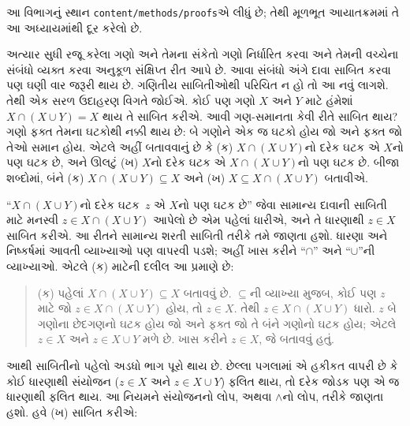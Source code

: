 \label{guunit:OLP-0721}


\begin{editorial}
આ વિભાગનું સ્થાન \verb|content/methods/proofs|એ લીધું છે;
તેથી મૂળભૂત આયાતક્રમમાં તે આ અધ્યાયમાંથી દૂર કરેલો છે.
\end{editorial}

\begin{explain}
અત્યાર સુધી રજૂ કરેલા ગણો અને તેમના સંકેતો ગણો નિર્ધારિત કરવા
અને તેમની વચ્ચેના સંબંધો વ્યક્ત કરવા અનુકૂળ સંક્ષિપ્ત રીત આપે છે.
આવા સંબંધો અંગે દાવા સાબિત કરવા પણ ઘણી વાર જરૂરી થાય છે.
ગણિતીય સાબિતીઓથી પરિચિત ન હો તો આ નવું લાગશે.
તેથી એક સરળ ઉદાહરણ વિગતે જોઈએ.
કોઈ પણ ગણો $X$ અને $Y$ માટે હંમેશાં
$X \cap (X \cup Y) = X$ થાય તે સાબિત કરીએ.
આવી ગણ-સમાનતા કેવી રીતે સાબિત થાય?
ગણો ફક્ત તેમના ઘટકોથી નક્કી થાય છે:
બે ગણોને એક જ ઘટકો હોય જો અને ફક્ત જો તેઓ સમાન હોય.
એટલે અહીં બતાવવાનું છે કે (ક) $X \cap (X \cup
Y)$નો દરેક ઘટક એ $X$નો પણ ઘટક છે,
અને ઊલટું (ખ) $X$નો દરેક ઘટક એ
$X \cap (X \cup Y)$નો પણ ઘટક છે.
બીજા શબ્દોમાં, બંને (ક) $X \cap (X \cup Y) \subseteq X$
અને (ખ) $X \subseteq X \cap (X \cup Y)$ બતાવીએ.

``$X \cap (X \cup Y)$નો દરેક ઘટક~$z$
એ $X$નો પણ ઘટક છે'' જેવા સામાન્ય દાવાની સાબિતી
માટે મનસ્વી $z \in X \cap (X \cup Y)$ આપેલો છે એમ
પહેલાં ધારીએ, અને તે ધારણાથી $z \in X$ સાબિત કરીએ.
આ રીતને સામાન્ય શરતી સાબિતી તરીકે તમે જાણતા હશો.
ધારણા અને નિષ્કર્ષમાં આવતી વ્યાખ્યાઓ પણ વાપરવી પડશે;
અહીં ખાસ કરીને ``$\cap$'' અને ``$\cup$''ની વ્યાખ્યાઓ.
એટલે (ક) માટેની દલીલ આ પ્રમાણે છે:

\begin{quote}
(ક) પહેલાં $X \cap (X \cup Y) \subseteq X$ બતાવવું છે.
$\subseteq$ની વ્યાખ્યા મુજબ, કોઈ પણ $z$ માટે
જો $z \in X \cap (X \cup Y)$ હોય, તો $z \in X$.
તેથી $z \in X \cap (X \cup Y)$ ધારો.
$z$ બે ગણોના છેદગણનો ઘટક હોય જો અને ફક્ત જો
તે બંને ગણોનો ઘટક હોય; એટલે $z \in X$ અને
$z \in X \cup Y$ મળે છે. ખાસ કરીને $z \in X$,
જે બતાવવું હતું.
\end{quote}

આથી સાબિતીનો પહેલો અડધો ભાગ પૂરો થાય છે.
છેલ્લા પગલામાં એ હકીકત વાપરી છે કે કોઈ ધારણાથી
સંયોજન ($z \in X$ અને $z \in X \cup Y$) ફલિત થાય,
તો દરેક જોડક પણ એ જ ધારણાથી ફલિત થાય.
આ નિયમને સંયોજનનો લોપ, અથવા $\land$નો લોપ, તરીકે જાણતા હશો.
હવે (ખ) સાબિત કરીએ:


\end{explain}
